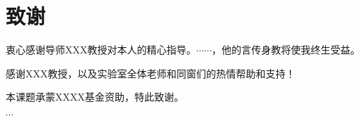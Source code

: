 ﻿%

\chapter*{致\quad 谢}

衷心感谢导师XXX教授对本人的精心指导。$\cdots\cdots$，他的言传身教将使我终生受益。

感谢XXX教授，以及实验室全体老师和同窗们的热情帮助和支持！

本课题承蒙XXXX基金资助，特此致谢。

$\cdots$